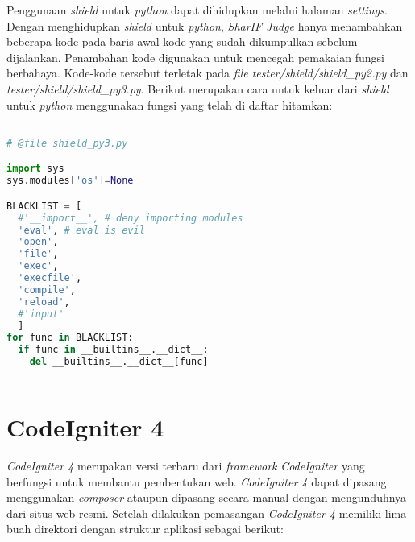 Penggunaan \textit{shield} untuk \textit{python} dapat dihidupkan melalui halaman \textit{settings}. Dengan menghidupkan \textit{shield} untuk \textit{python}, \textit{SharIF Judge} hanya menambahkan beberapa kode pada baris awal kode yang sudah dikumpulkan sebelum dijalankan. Penambahan kode digunakan untuk mencegah pemakaian fungsi berbahaya. Kode-kode tersebut terletak pada \textit{file tester/shield/shield\_py2.py} dan \textit{tester/shield/shield\_py3.py}. Berikut merupakan cara untuk keluar dari \textit{shield} untuk \textit{python} menggunakan fungsi yang telah di daftar hitamkan:

\begin{lstlisting}[language=Python,caption=Cara keluar dari \textit{shield} untuk \textit{python},label=kode:pythonshield]

# @file shield_py3.py

import sys
sys.modules['os']=None

BLACKLIST = [
  #'__import__', # deny importing modules
  'eval', # eval is evil
  'open',
  'file',
  'exec',
  'execfile',
  'compile',
  'reload',
  #'input'
  ]
for func in BLACKLIST:
  if func in __builtins__.__dict__:
    del __builtins__.__dict__[func]
    
\end{lstlisting}

\section{CodeIgniter 4\cite{codeigniter:23:ci4}}
\label{sec:ci4}

\textit{CodeIgniter 4} merupakan versi terbaru dari \textit{framework} \textit{CodeIgniter} yang berfungsi untuk membantu pembentukan web. \textit{CodeIgniter 4} dapat dipasang menggunakan \textit{composer} ataupun dipasang secara manual dengan mengunduhnya dari situs web resmi. Setelah dilakukan pemasangan \textit{CodeIgniter 4} memiliki lima buah direktori dengan struktur aplikasi sebagai berikut:

